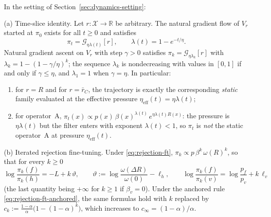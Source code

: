 \begin{theorem}\label{thm:dynamics-tabular}
In the setting of Section~\ref{sec:dynamics-setting}:

\smallskip\noindent\textup{(a) Time-slice identity.}
Let $r:\mathcal X\to\mathbb R$ be arbitrary. The natural gradient flow of
$V_r$ started at $\pi_0$ exists for all $t\ge 0$ and satisfies
\begin{equation}\label{eq:time-slice}
\pi_t=\mathcal G_{\eta\lambda(t)}[r],\qquad \lambda(t)=1-e^{-t/\eta}.
\end{equation}
Natural gradient ascent on $V_r$ with step $\gamma>0$ satisfies
$\pi_k=\mathcal G_{\eta\lambda_k}[r]$ with
$\lambda_k=1-(1-\gamma/\eta)^k$; the sequence $\lambda_k$ is nondecreasing
with values in $[0,1]$ if and only if $\gamma\le\eta$, and $\lambda_1=1$ when
$\gamma=\eta$. In particular:
\begin{enumerate}
\item[\textup{(a1)}] for $r=R$ and for $r=\bar r_C$, the trajectory is
exactly the corresponding \emph{static} family evaluated at the effective
pressure $\eta_{\mathrm{eff}}(t)=\eta\lambda(t)$;
\item[\textup{(a2)}] for operator~A,
$\pi_t(x)\propto p(x)\,\beta(x)^{\lambda(t)}\,e^{\eta\lambda(t)R(x)}$: the
pressure is $\eta\lambda(t)$ but the filter enters with exponent
$\lambda(t)<1$, so $\pi_t$ is \emph{not} the static operator~A at pressure
$\eta_{\mathrm{eff}}(t)$.
\end{enumerate}

\smallskip\noindent\textup{(b) Iterated rejection fine-tuning.}
Under \eqref{eq:rejection-ft}, $\pi_k\propto p\,\beta^{k}\,\omega(R)^k$, so
that for every $k\ge 0$
\begin{equation}\label{eq:rejection-logodds}
\log\frac{\pi_k(f)}{\pi_k(h)}=-L+k\,\vartheta,\qquad
\vartheta:=\log\frac{\omega(\Delta R)}{\omega(0)}-\ell_h,
\qquad
\log\frac{\pi_k(f)}{\pi_k(v)}=\log\frac{p_f}{p_v}+k\,\ell_v
\end{equation}
(the last quantity being $+\infty$ for $k\ge1$ if $\beta_v=0$). Under the
anchored rule \eqref{eq:rejection-ft-anchored}, the same formulas hold with
$k$ replaced by $c_k:=\frac{1-\alpha}{\alpha}\bigl(1-(1-\alpha)^k\bigr)$,
which increases to $c_\infty=(1-\alpha)/\alpha$.


\end{theorem}

